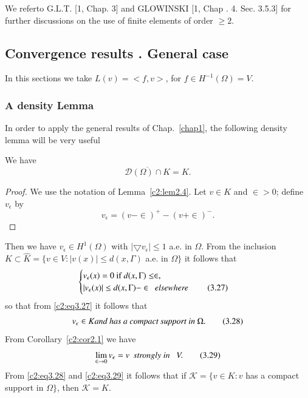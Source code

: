   We refer\pageoriginale  to G.L.T. [1, Chap. 3] and GLOWINSKI [1, Chap
    . 4. Sec. 3.5.3] for further discussions on the use of finite
  elements of order $\geq 2$. 
  
  \subsection{Convergence results . General case}\label{c2:ss3.6}%
  
  In this sections we take $L (v) = <f, v>$, for $f \in H^{-1}(\Omega) = V$.
  
  \subsubsection{A density Lemma}\label{c2:sss3.6.1} %
  
  In order to apply the general results of Chap.~\ref{chap1}, the following
  density lemma will be very useful 
  
\begin{lemma}\label{c2:lem3.1}%
We have 
\begin{equation}
\overline{\mathscr{D} (\Omega) \cap K} = K.\tag{3.25}\label{c2:eq3.25}
\end{equation}
\end{lemma}  
  
\begin{proof}
We use the notation of Lemma~\ref{c2:lem2.4}. Let $v \in K$ and $
\in > 0$; define $v_\epsilon $ by  
\begin{equation}
v_\epsilon = (v - \in)^+ - (v + \in)^-.\tag{3.26}\label{c2:eq3.26} 
\end{equation}
\end{proof}  
 Then we have $v_\epsilon \in H^1(\Omega)$ with $|\bigtriangledown
 v_\epsilon | \leq 1$ a.e. in $\Omega$. From the inclusion $K \subset
 \hat{K} = \{v \in V : | v (x) | \leq d (x, \Gamma)$ a.e. in
 $\Omega \}$ it follows that  
\begin{equation}
\begin{cases}
v_\epsilon (x) = 0 \text{ if } d (x, \Gamma) \leq \in,\\
|v_\epsilon (x)| \leq d (x, \Gamma) - \in ~~\text{\em elsewhere
}\tag{3.27}\label{c2:eq3.27}  
\end{cases}
\end{equation}
so that from \eqref{c2:eq3.27} it follows that 
\begin{equation}
v_\epsilon \in K \text{\em and has a compact support in }
\Omega. \tag{3.28}\label{c2:eq3.28} 
\end{equation}
From Corollary~\ref{c2:cor2.1} we have 
\begin{equation}
\lim_{\in \to 0} v_\epsilon = v~~ \text{\em strongly in
}~~V.\tag{3.29}\label{c2:eq3.29}   
\end{equation}
From \eqref{c2:eq3.28} and \eqref{c2:eq3.29} it follows that if
$\mathscr{K} = \{v \in K : v$ has a compact support in
$\Omega\}$, then $\mathscr{K} = K$.  

